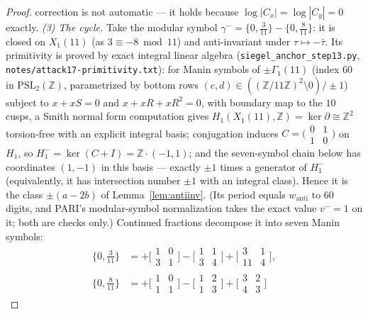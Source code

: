\documentclass[11pt]{amsart}
\theoremstyle{definition}
\theoremstyle{remark}
\newcommand{\Z}{\mathbb{Z}}
\begin{document}
\begin{proof}
correction is not automatic --- it holds because
$\log|C_x|=\log|C_y|=0$ exactly.
\emph{(3) The cycle.}  Take the modular symbol
$\gamma^-=\{0,\tfrac{3}{11}\}-\{0,\tfrac{8}{11}\}$: it is closed on
$X_1(11)$ (as $3\equiv-8\bmod 11$) and anti-invariant under
$\tau\mapsto-\bar\tau$.  Its primitivity is proved by exact integral
linear algebra (\texttt{siegel\_anchor\_step13.py},
\texttt{notes/attack17-primitivity.txt}): for Manin symbols of
$\pm\Gamma_1(11)$ (index $60$ in $\mathrm{PSL}_2(\Z)$, parametrized by
bottom rows $(c,d)\in((\Z/11\Z)^2\setminus0)/\pm1$) subject to $x+xS=0$
and $x+xR+xR^2=0$, with boundary map to the $10$ cusps, a Smith normal
form computation gives $H_1(X_1(11),\Z)=\ker\partial\cong\Z^2$
torsion-free with an explicit integral basis; conjugation induces
$C=\bigl(\begin{smallmatrix}0&1\\1&0\end{smallmatrix}\bigr)$ on $H_1$,
so $H_1^-=\ker(C+I)=\Z\cdot(-1,1)$; and the seven-symbol chain below
has coordinates $(1,-1)$ in this basis --- exactly $\pm1$ times a
generator of $H_1^-$ (equivalently, it has intersection number $\pm1$
with an integral class).  Hence it is the class $\pm(a-2b)$ of
Lemma~\ref{lem:antiinv}.  (Its period equals $w_{\mathrm{anti}}$ to $60$
digits, and PARI's modular-symbol normalization takes the exact value
$v^-=1$ on it; both are checks only.)  Continued fractions decompose it
into seven Manin symbols:
\[
\begin{aligned}
  \{0,\tfrac{3}{11}\}&=\textstyle
   +\bigl[\begin{smallmatrix}1&0\\3&1\end{smallmatrix}\bigr]
   -\bigl[\begin{smallmatrix}1&1\\3&4\end{smallmatrix}\bigr]
   +\bigl[\begin{smallmatrix}3&1\\11&4\end{smallmatrix}\bigr],\\
  \{0,\tfrac{8}{11}\}&=\textstyle
   +\bigl[\begin{smallmatrix}1&0\\1&1\end{smallmatrix}\bigr]
   -\bigl[\begin{smallmatrix}1&2\\1&3\end{smallmatrix}\bigr]
   +\bigl[\begin{smallmatrix}3&2\\4&3\end{smallmatrix}\bigr]

\end{aligned}\]
\end{proof}
\end{document}
